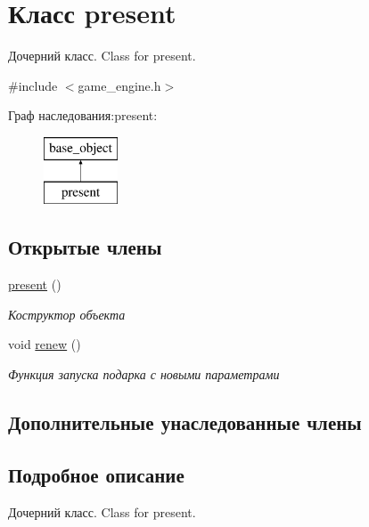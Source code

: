 \hypertarget{classpresent}{}\section{Класс present}
\label{classpresent}


Дочерний класс. Class for present.  




{\ttfamily \#include $<$game\+\_\+engine.\+h$>$}

Граф наследования\+:present\+:\begin{figure}[H]
\begin{center}
\leavevmode
\includegraphics[height=2.000000cm]{classpresent}
\end{center}
\end{figure}
\subsection*{Открытые члены}
\begin{DoxyCompactItemize}
\item 
\mbox{\label{classpresent_a06bf3a0b515b081093a6c3fdc10de80e}} 
\mbox{\hyperlink{classpresent_a06bf3a0b515b081093a6c3fdc10de80e}{present}} ()
\begin{DoxyCompactList}\small\item\em Коструктор объекта \end{DoxyCompactList}\item 
\mbox{\label{classpresent_a991ff8f7047cd6ab6e04b0935e9fba8c}} 
void \mbox{\hyperlink{classpresent_a991ff8f7047cd6ab6e04b0935e9fba8c}{renew}} ()
\begin{DoxyCompactList}\small\item\em Функция запуска подарка с новыми параметрами \end{DoxyCompactList}\end{DoxyCompactItemize}
\subsection*{Дополнительные унаследованные члены}


\subsection{Подробное описание}
Дочерний класс. Class for present. 

